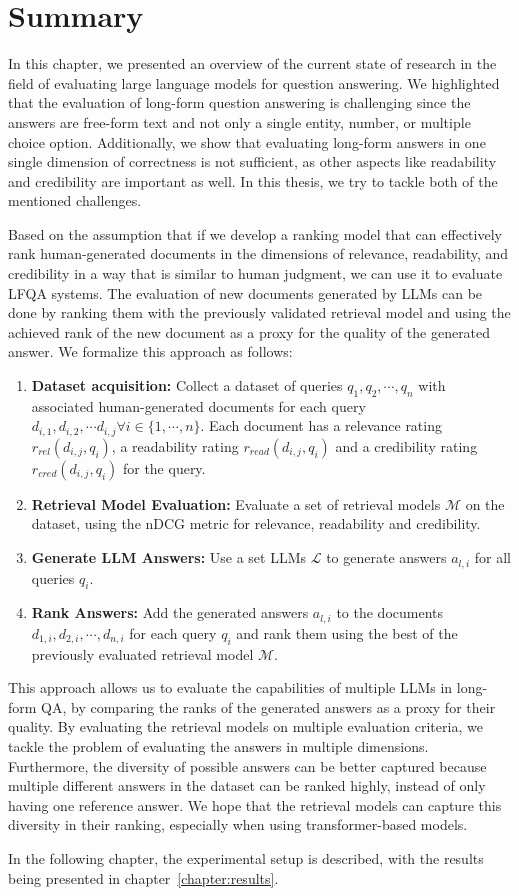 \section{Summary}
In this chapter, we presented an overview of the current state of research in the field of evaluating large language models for question answering.
We highlighted that the evaluation of long-form question answering is challenging since the answers are free-form text and not only a single entity, number, or multiple choice option.
Additionally, we show that evaluating long-form answers in one single dimension of correctness is not sufficient, as other aspects like readability and credibility are important as well.
In this thesis, we try to tackle both of the mentioned challenges.

Based on the assumption that if we develop a ranking model that can effectively rank human-generated documents in the dimensions of relevance, readability, and credibility in a way that is similar to human judgment, we can use it to evaluate LFQA systems.
The evaluation of new documents generated by LLMs can be done by ranking them with the previously validated retrieval model and using the achieved rank of the new document as a proxy for the quality of the generated answer.
We formalize this approach as follows:
\begin{enumerate}
    \item \textbf{Dataset acquisition:} Collect a dataset of queries \( q_1, q_2, \cdots, q_n \) with associated human-generated documents for each query \( d_{i,1}, d_{i,2}, \cdots d_{i,j} \forall i \in \{1, \cdots, n\} \). Each document has a relevance rating \( r_{rel}(d_{i,j}, q_i) \), a readability rating \( r_{read}(d_{i,j}, q_i) \) and a credibility rating \( r_{cred}(d_{i,j}, q_i) \) for the query.
    \item \textbf{Retrieval Model Evaluation:} Evaluate a set of retrieval models \( \mathcal{M}\) on the dataset, using the nDCG metric for relevance, readability and credibility.
    \item \textbf{Generate LLM Answers:} Use a set LLMs \( \mathcal{L} \) to generate answers \( a_{l,i} \) for all queries \( q_i \).
    \item \textbf{Rank Answers:} Add the generated answers \( a_{l,i} \) to the documents \(d_{1,i}, d_{2,i}, \cdots, d_{n,i} \) for each query \( q_i \) and rank them using the best of the previously evaluated retrieval model \( \mathcal{M} \).
\end{enumerate}
This approach allows us to evaluate the capabilities of multiple LLMs in long-form QA, by comparing the ranks of the generated answers as a proxy for their quality.
By evaluating the retrieval models on multiple evaluation criteria, we tackle the problem of evaluating the answers in multiple dimensions.
Furthermore, the diversity of possible answers can be better captured because multiple different answers in the dataset can be ranked highly, instead of only having one reference answer.
We hope that the retrieval models can capture this diversity in their ranking, especially when using transformer-based models.

In the following chapter, the experimental setup is described, with the results being presented in chapter~\ref{chapter:results}.